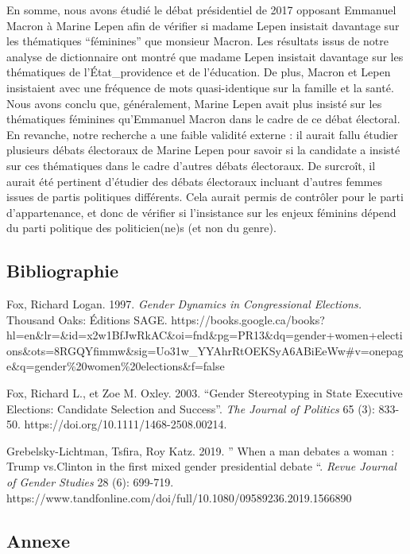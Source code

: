 \documentclass[
  letterpaper,
  DIV=11,
  numbers=noendperiod]{scrartcl}
\begin{document}
En somme, nous avons étudié le débat présidentiel de 2017 opposant
Emmanuel Macron à Marine Lepen afin de vérifier si madame Lepen
insistait davantage sur les thématiques ``féminines'' que monsieur
Macron. Les résultats issus de notre analyse de dictionnaire ont montré
que madame Lepen insistait davantage sur les thématiques de
l'État\_providence et de l'éducation. De plus, Macron et Lepen
insistaient avec une fréquence de mots quasi-identique sur la famille et
la santé. Nous avons conclu que, généralement, Marine Lepen avait plus
insisté sur les thématiques féminines qu'Emmanuel Macron dans le cadre
de ce débat électoral. En revanche, notre recherche a une faible
validité externe : il aurait fallu étudier plusieurs débats électoraux
de Marine Lepen pour savoir si la candidate a insisté sur ces
thématiques dans le cadre d'autres débats électoraux. De surcroît, il
aurait été pertinent d'étudier des débats électoraux incluant d'autres
femmes issues de partis politiques différents. Cela aurait permis de
contrôler pour le parti d'appartenance, et donc de vérifier si
l'insistance sur les enjeux féminins dépend du parti politique des
politicien(ne)s (et non du genre).

\hypertarget{bibliographie}{%
\subsection{Bibliographie}\label{bibliographie}}

Fox, Richard Logan. 1997. \emph{Gender Dynamics in Congressional
Elections.} Thousand Oaks: Éditions SAGE.
https://books.google.ca/books?hl=en\&lr=\&id=x2w1BfJwRkAC\&oi=fnd\&pg=PR13\&dq=gender+women+elections\&ots=8RGQYfimmw\&sig=Uo31w\_YYAhrRtOEKSyA6ABiEeWw\#v=onepage\&q=gender\%20women\%20elections\&f=false

Fox, Richard L., et Zoe M. Oxley. 2003. ``Gender Stereotyping in State
Executive Elections: Candidate Selection and Success''. \emph{The
Journal of Politics} 65 (3): 833-50.
https://doi.org/10.1111/1468-2508.00214.

Grebelsky-Lichtman, Tsfira, Roy Katz. 2019. '' When a man debates a
woman : Trump vs.Clinton in the first mixed gender presidential debate
``. \emph{Revue Journal of Gender Studies} 28 (6): 699-719.
https://www.tandfonline.com/doi/full/10.1080/09589236.2019.1566890

\hypertarget{annexe}{%
\subsection{Annexe}\label{annexe}}
\end{document}
